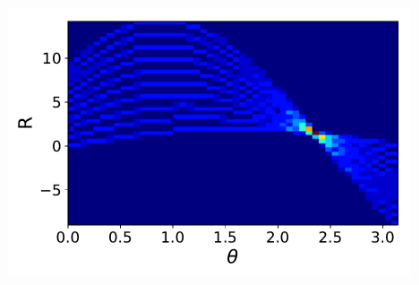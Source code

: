 \documentclass[aspectratio=169, hyperref={colorlinks=true,pdfpagelabels=false,linkcolor=black}, xcolor=dvipsnames,10pt]{beamer}
\begin{document}
\begin{frame}
\begin{columns}
      \centering
      \includegraphics[width=0.8\textwidth]{figures/line_hough.pdf}
  \end{columns}

\end{frame}
\end{document}
